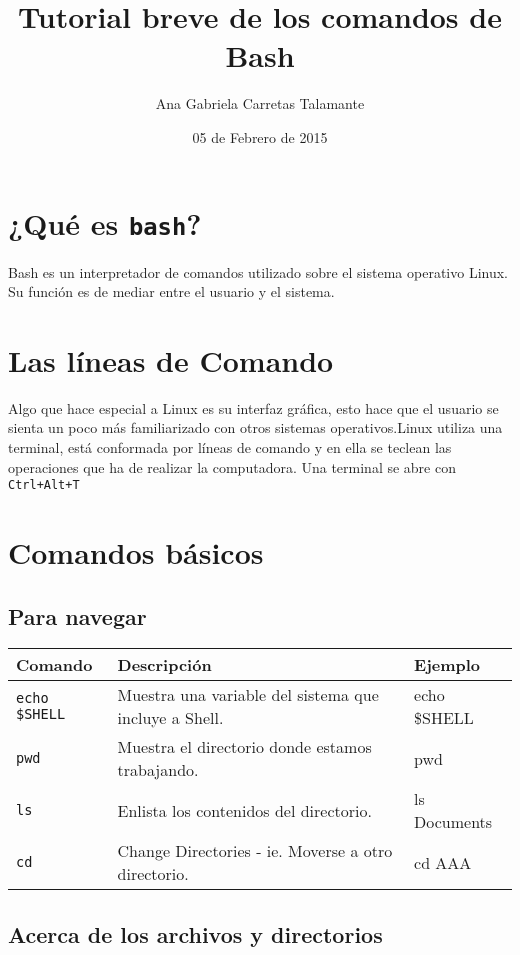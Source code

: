 \documentclass[12pt]{article}
\title{Tutorial breve de los comandos de Bash}
\author{Ana Gabriela Carretas Talamante}
\date{05 de Febrero de 2015}
\begin{document}
\maketitle

\section{¿Qué es {\tt bash}?}

Bash es un interpretador de comandos utilizado sobre el sistema operativo Linux.
Su función es de mediar entre el usuario y el sistema.

\section{Las líneas de Comando}

Algo que hace especial a Linux es su interfaz gráfica, esto hace que el usuario se sienta un poco más familiarizado con otros sistemas operativos.Linux utiliza una terminal, está conformada por líneas de comando y en ella se teclean las operaciones que ha de realizar la computadora. Una terminal se abre con {\tt Ctrl+Alt+T} 

\section{Comandos básicos}


\subsection{Para navegar}
\begin{tabular}{|p{3cm}|p{10cm}|p{2cm}|}
\hline
Comando & Descripción & Ejemplo \\
\hline
{\tt echo \$SHELL} & Muestra una variable del sistema que incluye a Shell. & echo \$SHELL \\ \hline
{\tt pwd} & Muestra el directorio donde estamos trabajando. & pwd  \\ \hline
{\tt ls} & Enlista los contenidos del directorio. & ls Documents \\ \hline
{\tt cd} & Change Directories - ie. Moverse a otro directorio. & cd AAA\\ \hline
\end{tabular} 

\subsection{Acerca de los archivos y directorios}
\end{document}
